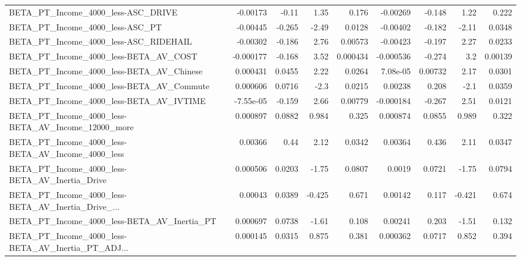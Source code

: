 \begin{tabular}{lrrrrrrrr}
BETA\_PT\_Income\_4000\_less-ASC\_DRIVE                 &    -0.00173 &        -0.11 &     1.35 &    0.176 &   -0.00269 &      -0.148 &         1.22 &         0.222 \\
BETA\_PT\_Income\_4000\_less-ASC\_PT                    &    -0.00445 &       -0.265 &    -2.49 &   0.0128 &   -0.00402 &      -0.182 &        -2.11 &        0.0348 \\
BETA\_PT\_Income\_4000\_less-ASC\_RIDEHAIL              &    -0.00302 &       -0.186 &     2.76 &  0.00573 &   -0.00423 &      -0.197 &         2.27 &        0.0233 \\
BETA\_PT\_Income\_4000\_less-BETA\_AV\_COST              &   -0.000177 &       -0.168 &     3.52 & 0.000434 &  -0.000536 &      -0.274 &          3.2 &       0.00139 \\
BETA\_PT\_Income\_4000\_less-BETA\_AV\_Chinese           &    0.000431 &       0.0455 &     2.22 &   0.0264 &   7.08e-05 &     0.00732 &         2.17 &        0.0301 \\
BETA\_PT\_Income\_4000\_less-BETA\_AV\_Commute           &    0.000606 &       0.0716 &     -2.3 &   0.0215 &    0.00238 &       0.208 &         -2.1 &        0.0359 \\
BETA\_PT\_Income\_4000\_less-BETA\_AV\_IVTIME            &   -7.55e-05 &       -0.159 &     2.66 &  0.00779 &  -0.000184 &      -0.267 &         2.51 &        0.0121 \\
BETA\_PT\_Income\_4000\_less-BETA\_AV\_Income\_12000\_more &    0.000897 &       0.0882 &    0.984 &    0.325 &   0.000874 &      0.0855 &        0.989 &         0.322 \\
BETA\_PT\_Income\_4000\_less-BETA\_AV\_Income\_4000\_less  &     0.00366 &         0.44 &     2.12 &   0.0342 &    0.00364 &       0.436 &         2.11 &        0.0347 \\
BETA\_PT\_Income\_4000\_less-BETA\_AV\_Inertia\_Drive     &    0.000506 &       0.0203 &    -1.75 &   0.0807 &     0.0019 &      0.0721 &        -1.75 &        0.0794 \\
BETA\_PT\_Income\_4000\_less-BETA\_AV\_Inertia\_Drive\_... &     0.00043 &       0.0389 &   -0.425 &    0.671 &    0.00142 &       0.117 &       -0.421 &         0.674 \\
BETA\_PT\_Income\_4000\_less-BETA\_AV\_Inertia\_PT        &    0.000697 &       0.0738 &    -1.61 &    0.108 &    0.00241 &       0.203 &        -1.51 &         0.132 \\
BETA\_PT\_Income\_4000\_less-BETA\_AV\_Inertia\_PT\_ADJ... &    0.000145 &       0.0315 &    0.875 &    0.381 &   0.000362 &      0.0717 &        0.852 &         0.394 \\

\end{tabular}
